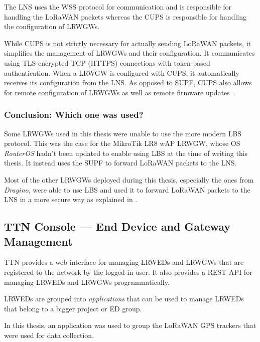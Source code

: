The \ac{LNS} uses the \ac{WSS} protocol for communication and is responsible for handling the \ac{LoRaWAN} packets whereas the \ac{CUPS} is responsible for handling the configuration of \aclp{LRWGW}.

While \ac{CUPS} is not strictly necessary for actually sending \ac{LoRaWAN} packets, it simplifies the management of \aclp{LRWGW} and their configuration.
It communicates using \ac{TLS}-encrypted \ac{TCP} (\ac{HTTPS}) connections with token-based authentication.
When a \acl{LRWGW} is configured with \ac{CUPS}, it automatically receives its configuration from the \ac{LNS}.
As opposed to \ac{SUPF}, \ac{CUPS} also allows for remote configuration of \aclp{LRWGW} as well as remote firmware updates~\cite{the_things_industries_bv_lora_2022}.

\subsubsection{Conclusion: Which one was used?}

Some \aclp{LRWGW} used in this thesis were unable to use the more modern \acl{LBS} protocol.
This was the case for the MikroTik LR8 wAP \acl{LRWGW}, whose \ac{OS} \emph{RouterOS} hadn't been updated to enable using \ac{LBS} at the time of writing this thesis.
It instead uses the \ac{SUPF} to forward \ac{LoRaWAN} packets to the \ac{LNS}.

Most of the other \aclp{LRWGW} deployed during this thesis, especially the ones from \emph{Dragino}, were able to use \ac{LBS} and used it to forward \ac{LoRaWAN} packets to the \ac{LNS} in a more secure way as explained in .

\subsection{\acl{TTN} Console — End Device and Gateway Management}\label{sec:web-interface-and-device-gateway-management}

\ac{TTN} provides a web interface for managing \aclp{LRWED} and \aclp{LRWGW} that are registered to the network by the logged-in user.
It also provides a \ac{REST} \ac{API} for managing \aclp{LRWED} and \aclp{LRWGW} programmatically.

\aclp{LRWED} are grouped into \emph{applications} that can be used to manage \aclp{LRWED} that belong to a bigger project or \acl{ED} group.

In this thesis, an application was used to group the \ac{LoRaWAN} \ac{GPS} trackers that were used for data collection.

